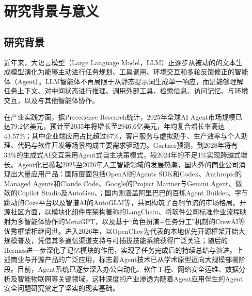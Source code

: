 \section{研究背景与意义}

\subsection{研究背景}
近年来，大语言模型（Large Language Model，LLM）正逐步从被动的的文本生成模型演化为能够主动进行任务规划、工具调用、环境交互和多轮反馈修正的智能体（Agent）。LLM智能体不再局限于从静态提示词生成单一响应，而是能够理解任务上下文、对中间状态进行推理、调用外部工具、检索信息、访问记忆、与环境交互，以及与其他智能体协作\cite{wang2026fromagenttraces}。

在产业实践方面，据Precedence Research统计，2025年全球AI Agent市场规模已达79.2亿美元，预计至2035年将增长至2946.6亿美元，年均复合增长率高达43.57\%；其中企业端应用占比超过67\%，客户服务与虚拟助手、生产效率与个人助理、代码与软件开发等场景构成主要需求驱动力\cite{precedence2025aiagents}。Gartner预测，到2028年将有33\%的生成式AI交互采用Agent式自主决策模式，较2024年的不足1\%实现跨越式增长\cite{gartner2025agentic}。Agent化已掀起2025至2026年人工智能领域的发展热潮，国内外的商业公司涌现出大量应用产品：国际层面包括OpenAI的Agents SDK和Codex、Anthropic的Managed Agents和Claude Code、Google的Project Mariner与Gemini Agent、微软的Copilot Studio及AutoGen\cite{wu2024autogen}、；国内则涵盖阿里巴巴的百炼Agent Builder、字节跳动的Coze平台以及智谱AI的AutoGLM等，共同构筑了百舸争流的市场格局。开源社区方面，以模块化组件库架构著称的LangChain\cite{langchain}、将软件公司标准作业流程映射为多智能体协作的MetaGPT\cite{hong2024metagpt}，以及基于“角色扮演+任务分工”机制的CrewAI等优秀框架相继问世。进入2026年，以OpenClaw为代表的本地优先开源框架开始大规模普及，凭借其多通信渠道支持与可插拔技能系统获得广泛关注；随后的Hermes进一步深化了记忆模块的作用，实现了任务完成后的持续总结与演进。上述商业与开源产品的广泛应用，标志着Agent技术已从学术原型迈向大规模部署阶段。目前，Agent系统已逐步深入办公自动化、软件工程、网络安全运维、数据分析及智能物联网等关键领域\cite{wang2024survey,xi2025rise,park2023generative}，这种深度的产业渗透为随着Agent应用伴生的Agent安全问题研究奠定了坚实的现实基础。

